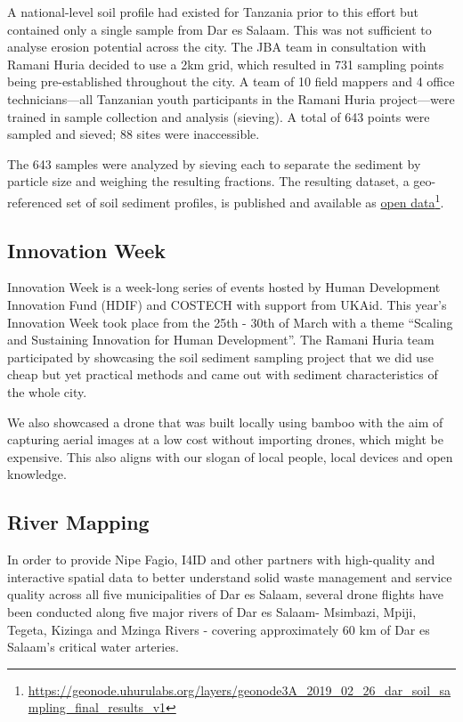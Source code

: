\documentclass[a4paper,12pt,twoside]{article}
\begin{document}
\begin{multicols}{2}
A national-level soil profile had existed for Tanzania prior to this effort but contained only a single sample from Dar es Salaam. This was not sufficient to analyse erosion potential across the city. The JBA team in consultation with Ramani Huria decided to use a 2km grid, which resulted in 731 sampling points being pre-established throughout the city. A team of 10 field mappers and 4 office technicians—all Tanzanian youth participants in the Ramani Huria project—were trained in sample collection and analysis (sieving). A total of 643 points were sampled and sieved; 88 sites were inaccessible.


The 643 samples were analyzed by sieving each to separate the sediment by particle size and weighing the resulting fractions. The resulting dataset, a geo-referenced set of soil sediment profiles, is published and available as \href{https://geonode.uhurulabs.org/layers/geonode3A_2019_02_26_dar_soil_sampling_final_results_v1}{open data}\footnote{\url{https://geonode.uhurulabs.org/layers/geonode3A_2019_02_26_dar_soil_sampling_final_results_v1}}.

\subsection{Innovation Week}
Innovation Week is a week-long series of events hosted by Human Development Innovation Fund (HDIF) and COSTECH with support from UKAid. This year’s Innovation Week took place from the 25th - 30th of March with a theme “Scaling and Sustaining Innovation for Human Development”. The Ramani Huria team participated by showcasing the soil sediment sampling project that we did use cheap but yet practical methods and came out with sediment characteristics of the whole city.

\medskip

We also showcased a drone that was built locally using bamboo with the aim of capturing aerial images at a low cost without importing drones, which might be expensive. This also aligns with our slogan of local people, local devices and open knowledge.

\subsection{River Mapping}
In order to provide Nipe Fagio, I4ID and other partners with high-quality and interactive spatial data to better understand solid waste management and service quality across all five municipalities of Dar es Salaam, several drone flights have been conducted along five major rivers of Dar es Salaam- Msimbazi, Mpiji, Tegeta, Kizinga and Mzinga Rivers - covering approximately 60 km of Dar es Salaam’s critical water arteries. 


\end{multicols}
\end{document}
